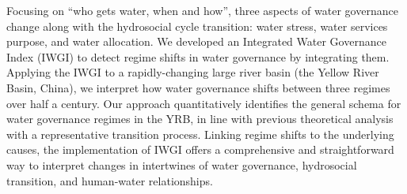 Focusing on ``who gets water, when and how'', three aspects of water governance change along with the hydrosocial cycle transition: water stress, water services purpose, and water allocation. We developed an Integrated Water Governance Index (IWGI) to detect regime shifts in water governance by integrating them. Applying the IWGI to a rapidly-changing large river basin (the Yellow River Basin, China), we interpret how water governance shifts between three regimes over half a century. Our approach quantitatively identifies the general schema for water governance regimes in the YRB, in line with previous theoretical analysis with a representative transition process. Linking regime shifts to the underlying causes, the implementation of IWGI offers a comprehensive and straightforward way to interpret changes in intertwines of water governance, hydrosocial transition, and human-water relationships.
